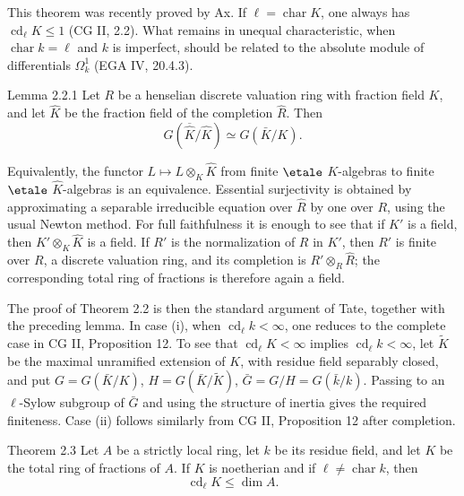 This theorem was recently proved by Ax. If \(\ell=\operatorname{char}K\), one always has \(\operatorname{cd}_\ell K\leq1\) (CG II, 2.2). What remains in unequal characteristic, when \(\operatorname{char}k=\ell\) and \(k\) is imperfect, should be related to the absolute module of differentials \(\Omega^1_k\) (EGA IV, 20.4.3).

\begin{statement}{Lemma 2.2.1}
Let \(R\) be a henselian discrete valuation ring with fraction field \(K\), and let \(\widehat K\) be the fraction field of the completion \(\widehat R\). Then
\[
G(\overline{\widehat K}/\widehat K)\simeq G(\bar K/K).
\]
\end{statement}

\begin{prooftext}
Equivalently, the functor \(L\mapsto L\otimes_K\widehat K\) from finite \(\etale\) \(K\)-algebras to finite \(\etale\) \(\widehat K\)-algebras is an equivalence. Essential surjectivity is obtained by approximating a separable irreducible equation over \(\widehat R\) by one over \(R\), using the usual Newton method. For full faithfulness it is enough to see that if \(K'\) is a field, then \(K'\otimes_K\widehat K\) is a field. If \(R'\) is the normalization of \(R\) in \(K'\), then \(R'\) is finite over \(R\), a discrete valuation ring, and its completion is \(R'\otimes_R\widehat R\); the corresponding total ring of fractions is therefore again a field.
\end{prooftext}

The proof of Theorem 2.2 is then the standard argument of Tate, together with the preceding lemma. In case (i), when \(\operatorname{cd}_\ell k<\infty\), one reduces to the complete case in CG II, Proposition 12. To see that \(\operatorname{cd}_\ell K<\infty\) implies \(\operatorname{cd}_\ell k<\infty\), let \(\widetilde K\) be the maximal unramified extension of \(K\), with residue field separably closed, and put \(G=G(\bar K/K)\), \(H=G(\bar K/\widetilde K)\), \(\bar G=G/H=G(\bar k/k)\). Passing to an \(\ell\)-Sylow subgroup of \(\bar G\) and using the structure of inertia gives the required finiteness. Case (ii) follows similarly from CG II, Proposition 12 after completion.

\begin{statement}{Theorem 2.3}
Let \(A\) be a strictly local ring, let \(k\) be its residue field, and let \(K\) be the total ring of fractions of \(A\). If \(K\) is noetherian and if \(\ell\ne\operatorname{char}k\), then
\[
\operatorname{cd}_\ell K\leq \dim A.
\]
\end{statement}

